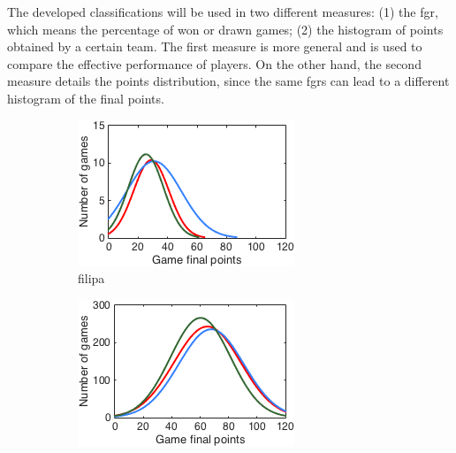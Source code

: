 The developed classifications will be used in two different measures: (1) the \ac{fgr}, which means the percentage of won or drawn games; (2) the histogram of points obtained by a certain team.
The first measure is more general and is used to compare the effective performance of players.
On the other hand, the second measure details the points distribution, since the same \acp{fgr} can lead to a different histogram of the final points.

\begin{figure}[h]
        \centering
        \begin{subfigure}[h]{0.32\textwidth}
                \includegraphics[width=\textwidth]{./img/4/ABChard}
                \caption{filipa}
                \label{fig:ABC-Hhard}
        \end{subfigure}
        \begin{subfigure}[h]{0.32\textwidth}
                \includegraphics[width=\textwidth]{./img/4/ABCmedium}

\end{subfigure}
\end{figure}

